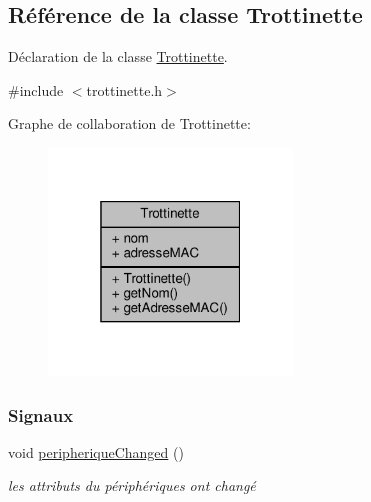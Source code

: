 \hypertarget{class_trottinette}{}\subsection{Référence de la classe Trottinette}
\label{class_trottinette}


Déclaration de la classe \hyperlink{class_trottinette}{Trottinette}.  




{\ttfamily \#include $<$trottinette.\+h$>$}



Graphe de collaboration de Trottinette\+:\nopagebreak
\begin{figure}[H]
\begin{center}
\leavevmode
\includegraphics[width=184pt]{class_trottinette__coll__graph}
\end{center}
\end{figure}
\subsubsection*{Signaux}
\begin{DoxyCompactItemize}
\item 
void \hyperlink{class_trottinette_a44ae1514740ee0a1a55a9dab39c37aaf}{peripherique\+Changed} ()
\begin{DoxyCompactList}\small\item\em les attributs du périphériques ont changé \end{DoxyCompactList}\end{DoxyCompactItemize}
